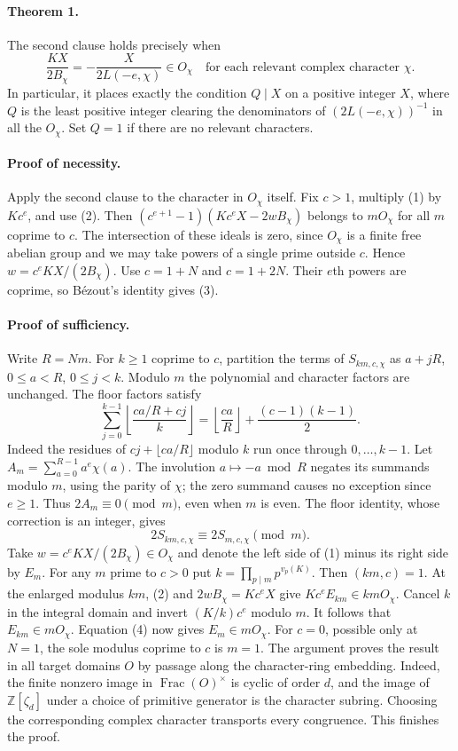 \paragraph{Theorem 1.}
The second clause holds precisely when
\[
       \frac{KX}{2B_\chi}=-\frac{X}{2L(-e,\chi)}\in O_\chi
       \quad\text{for each relevant complex character }\chi.       \tag{3}
\]
In particular, it places exactly the condition $Q\mid X$ on a positive
integer $X$, where $Q$ is the least positive integer clearing the
denominators of $(2L(-e,\chi))^{-1}$ in all the $O_\chi$. Set $Q=1$ if
there are no relevant characters.

\paragraph{Proof of necessity.}
Apply the second clause to the character in $O_\chi$ itself. Fix $c>1$,
multiply (1) by $Kc^e$, and use (2). Then
$(c^{e+1}-1)(Kc^eX-2wB_\chi)$ belongs to $mO_\chi$ for all $m$ coprime
to $c$. The intersection of these ideals is zero, since $O_\chi$ is a
finite free abelian group and we may take powers of a single prime outside
$c$. Hence $w=c^e KX/(2B_\chi)$. Use $c=1+N$ and $c=1+2N$.
Their $e$th powers are coprime, so B\'ezout's identity gives (3).

\paragraph{Proof of sufficiency.}
Write $R=Nm$. For $k\ge1$ coprime to $c$, partition the terms of $S_{km,c,\chi}$
as $a+jR$, $0\le a<R$, $0\le j<k$. Modulo $m$ the polynomial and character
factors are unchanged. The floor factors satisfy
\[
 \sum_{j=0}^{k-1}\left\lfloor\frac{ca/R+cj}{k}\right\rfloor
  =\left\lfloor\frac{ca}{R}\right\rfloor+\frac{(c-1)(k-1)}{2}.
\]
Indeed the residues of $cj+\lfloor ca/R\rfloor$ modulo $k$ run once
through $0,\ldots,k-1$. Let $A_m=\sum_{a=0}^{R-1}a^e\chi(a)$.
The involution $a\mapsto -a\bmod R$ negates its summands modulo $m$,
using the parity of $\chi$; the zero summand causes no exception since
$e\ge1$. Thus $2A_m\equiv0\pmod m$, even when $m$ is even.
The floor identity, whose correction is an integer, gives
\[
                2S_{km,c,\chi}\equiv2S_{m,c,\chi}\pmod m.          \tag{4}
\]
Take $w=c^eKX/(2B_\chi)\in O_\chi$ and denote the left side of (1) minus
its right side by $E_m$. For any $m$ prime to $c>0$ put
$k=\prod_{p\mid m}p^{v_p(K)}$. Then $(km,c)=1$. At the enlarged modulus
$km$, (2) and $2w B_\chi=Kc^eX$ give $Kc^e E_{km}\in kmO_\chi$.
Cancel $k$ in the integral domain and invert $(K/k)c^e$ modulo $m$.
It follows that $E_{km}\in mO_\chi$. Equation (4) now gives
$E_m\in mO_\chi$. For $c=0$, possible only at $N=1$, the sole modulus
coprime to $c$ is $m=1$. The argument proves the result in all target
domains $O$ by passage along the character-ring embedding. Indeed, the finite
nonzero image in $\operatorname{Frac}(O)^\times$ is cyclic of order $d$, and
the image of $\mathbb Z[\zeta_d]$ under a choice of primitive generator is
the character subring. Choosing the corresponding complex character
transports every congruence. This finishes the proof.


